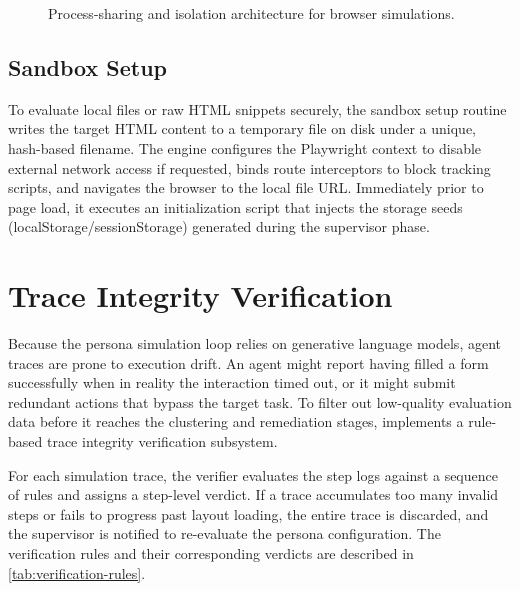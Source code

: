 \begin{figure}[htbp]
  \centering
  \caption{Process-sharing and isolation architecture for browser simulations.}
  \label{fig:shared-browser}
\end{figure}

\subsection{Sandbox Setup}
\label{sec:sandbox}

To evaluate local files or raw HTML snippets securely, the sandbox setup routine writes the target HTML content to a temporary file on disk under a unique, hash-based filename. The engine configures the Playwright context to disable external network access if requested, binds route interceptors to block tracking scripts, and navigates the browser to the local file URL. Immediately prior to page load, it executes an initialization script that injects the storage seeds (localStorage/sessionStorage) generated during the supervisor phase.


\section{Trace Integrity Verification}
\label{sec:trace-verification}

Because the persona simulation loop relies on generative language models, agent traces are prone to execution drift. An agent might report having filled a form successfully when in reality the interaction timed out, or it might submit redundant actions that bypass the target task. To filter out low-quality evaluation data before it reaches the clustering and remediation stages, \versimux{} implements a rule-based trace integrity verification subsystem.

For each simulation trace, the verifier evaluates the step logs against a sequence of rules and assigns a step-level verdict. If a trace accumulates too many invalid steps or fails to progress past layout loading, the entire trace is discarded, and the supervisor is notified to re-evaluate the persona configuration. The verification rules and their corresponding verdicts are described in \cref{tab:verification-rules}.

